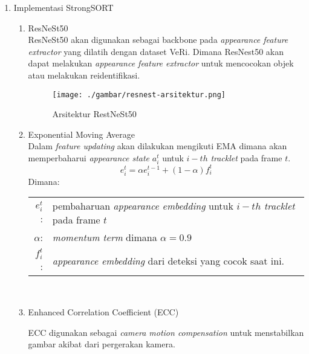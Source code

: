 \begin{enumerate}
\item Implementasi StrongSORT
 \begin{enumerate}
\item{ResNeSt50}\\
ResNeSt50 akan digunakan sebagai backbone pada \emph{appearance feature extractor} yang dilatih dengan dataset VeRi. Dimana ResNest50 akan dapat melakukan \emph{appearance feature extractor} untuk mencocokan objek atau melakukan reidentifikasi. 


\begin{figure}[H]
  \centering
  \texttt{[image: ./gambar/resnest-arsitektur.png]}
  \caption{Arsitektur RestNeSt50}
  \label{fig:IoUequation}
\end{figure}

\item{Exponential Moving Average}\\
Dalam \emph{feature updating} akan dilakukan mengikuti EMA dimana akan memperbaharui \emph{appearance state} $a_i^t$ untuk $i-th$ \emph{tracklet} pada frame $t$.
\begin{equation}
e_i^t={\alpha e_i^{t-1} +  \left(1-\alpha\right) f_i^t}
\end{equation}
Dimana:\\
\hspace*{3em}
\begin{tabular}{rl}
    $e_i^t$:& pembaharuan \emph{appearance embedding} untuk $i-th$ \emph{tracklet} pada frame $t$ \\
    $ \alpha$:& \emph{momentum term} dimana $ \alpha = 0.9$  \\
    $  f_i^t$:&\emph{appearance embedding} dari deteksi yang cocok saat ini. \\
\end{tabular}
\\

\item{Enhanced Correlation Coefficient (ECC)}

ECC digunakan sebagai \emph{camera motion compensation} untuk menstabilkan gambar akibat dari pergerakan kamera.


\end{enumerate}
\end{enumerate}
